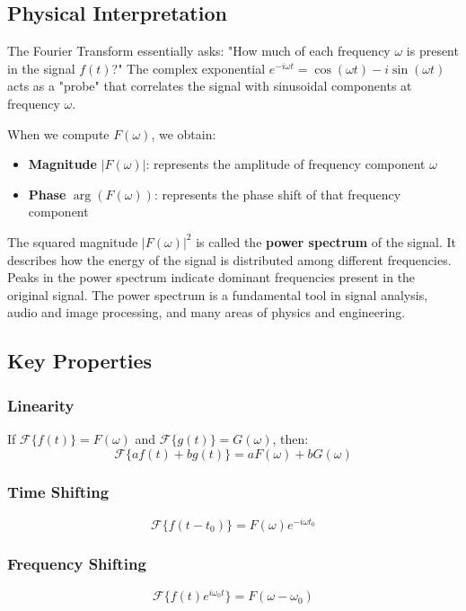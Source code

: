 \documentclass[11pt,a4paper]{article}
\begin{document}
\subsection{Physical Interpretation}

The Fourier Transform essentially asks: "How much of each frequency $\omega$ is present in the signal $f(t)$?" The complex exponential $e^{-i\omega t} = \cos(\omega t) - i\sin(\omega t)$ acts as a "probe" that correlates the signal with sinusoidal components at frequency $\omega$.

When we compute $F(\omega)$, we obtain:
\begin{itemize}
    \item \textbf{Magnitude} $|F(\omega)|$: represents the amplitude of frequency component $\omega$
    \item \textbf{Phase} $\arg(F(\omega))$: represents the phase shift of that frequency component
\end{itemize}

The squared magnitude $|F(\omega)|^2$ is called the \textbf{power spectrum} of the signal. It describes how the energy of the signal is distributed among different frequencies. Peaks in the power spectrum indicate dominant frequencies present in the original signal. The power spectrum is a fundamental tool in signal analysis, audio and image processing, and many areas of physics and engineering.

\subsection{Key Properties}

\subsubsection{Linearity}
If $\mathcal{F}\{f(t)\} = F(\omega)$ and $\mathcal{F}\{g(t)\} = G(\omega)$, then:
\begin{equation}
\mathcal{F}\{af(t) + bg(t)\} = aF(\omega) + bG(\omega)
\end{equation}

\subsubsection{Time Shifting}
\begin{equation}
\mathcal{F}\{f(t-t_0)\} = F(\omega)e^{-i\omega t_0}
\end{equation}

\subsubsection{Frequency Shifting}
\begin{equation}
\mathcal{F}\{f(t)e^{i\omega_0 t}\} = F(\omega - \omega_0)
\end{equation}
\end{document}
